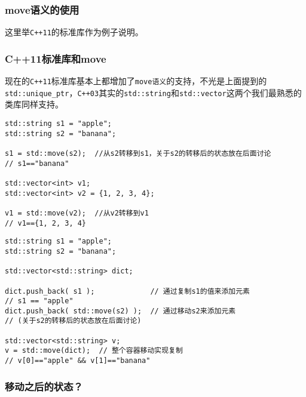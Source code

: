 \subsubsection[move语义的使用]{\texorpdfstring{\protect\hypertarget{2move_61}{}{}move语义的使用}{2.move语义的使用}}\label{moveux8bedux4e49ux7684ux4f7fux7528}

这里举\texttt{C++11}的标准库作为例子说明。

\subsubsection[C++11标准库和move]{\texorpdfstring{\protect\hypertarget{21C11move_64}{}{}C++11标准库和move}{2.1.C++11标准库和move}}\label{c11ux6807ux51c6ux5e93ux548cmove}

现在的\texttt{C++11}标准库基本上都增加了\texttt{move语义}的支持，不光是上面提到的\texttt{std::unique\_ptr}，\texttt{C++03}其实的\texttt{std::string}和\texttt{std::vector}这两个我们最熟悉的类库同样支持。

\begin{lstlisting}
std::string s1 = "apple";
std::string s2 = "banana";

s1 = std::move(s2);  //从s2转移到s1，关于s2的转移后的状态放在后面讨论
// s1=="banana"

std::vector<int> v1;
std::vector<int> v2 = {1, 2, 3, 4};

v1 = std::move(v2);  //从v2转移到v1
// v1=={1, 2, 3, 4}
\end{lstlisting}

\begin{lstlisting}
std::string s1 = "apple";
std::string s2 = "banana";

std::vector<std::string> dict;

dict.push_back( s1 );             // 通过复制s1的值来添加元素
// s1 == "apple"
dict.push_back( std::move(s2) );  // 通过移动s2来添加元素
// (关于s2的转移后的状态放在后面讨论)

std::vector<std::string> v;
v = std::move(dict);  // 整个容器移动实现复制
// v[0]=="apple" && v[1]=="banana"
\end{lstlisting}

\subsubsection[移动之后的状态？]{\texorpdfstring{\protect\hypertarget{22_96}{}{}移动之后的状态？}{2.2.移动之后的状态？}}\label{ux79fbux52a8ux4e4bux540eux7684ux72b6ux6001}

